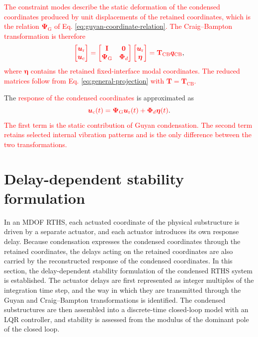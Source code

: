\documentclass[11pt,a4paper]{article}
\numberwithin{equation}{section}
\newcommand{\rev}[1]{\textcolor{red}{#1}}
\begin{document}
\rev{The constraint modes describe the static deformation of the condensed coordinates produced by unit displacements of the retained coordinates, which is the relation \(\bm{\Psi}_{\mathrm{G}}\) of Eq. \eqref{eq:guyan-coordinate-relation}. The Craig--Bampton transformation is therefore}
\begin{equation}
	\rev{\begin{bmatrix}
			\bm{u}_{\mathrm{r}}\\
			\bm{u}_{\mathrm{c}}
		\end{bmatrix}
		=
		\begin{bmatrix}
			\mathbf{I} & \mathbf{0}\\
			\bm{\Psi}_{\mathrm{G}} & \bm{\Phi}_{d}
		\end{bmatrix}
		\begin{bmatrix}
			\bm{u}_{\mathrm{r}}\\
			\bm{\eta}
		\end{bmatrix}
		=
		\mathbf{T}_{\mathrm{CB}}\bm{q}_{\mathrm{CB}}},
	\label{eq:cb-transformation}
\end{equation}
\rev{where \(\bm{\eta}\) contains the retained fixed-interface modal coordinates. The reduced matrices follow from Eq. \eqref{eq:general-projection} with \(\mathbf{T}=\mathbf{T}_{\mathrm{CB}}\).}

The \rev{response of the condensed coordinates} is approximated as
\begin{equation}
	\rev{\bm{u}_{\mathrm{c}}(t)=
		\bm{\Psi}_{\mathrm{G}}\bm{u}_{\mathrm{r}}(t)
		+\bm{\Phi}_{d}\bm{\eta}(t)}.
	\label{eq:cb-internal-recovery}
\end{equation}
\rev{The first term is the static contribution of Guyan condensation. The second term retains selected internal vibration patterns and is the only difference between the two transformations.}


\section{Delay-dependent stability formulation} \label{sec3}

In an MDOF RTHS, each actuated coordinate of the physical substructure is driven by a separate actuator, and each actuator introduces its own response delay. Because condensation expresses the condensed coordinates through the retained coordinates, the delays acting on the retained coordinates are also carried by the reconstructed response of the condensed coordinates. In this section, the delay-dependent stability formulation of the condensed RTHS system is established. The actuator delays are first represented as integer multiples of the integration time step, and the way in which they are transmitted through the Guyan and Craig--Bampton transformations is identified. The condensed substructures are then assembled into a discrete-time closed-loop model with an LQR controller, and stability is assessed from the modulus of the dominant pole of the closed loop.
\end{document}

